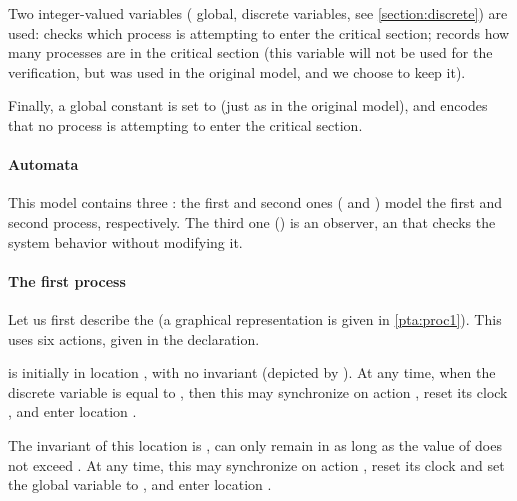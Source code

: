 Two integer-valued variables (\ie{} global, discrete variables, see \cref{section:discrete}) are used:
 checks which process is attempting to enter the critical section;
 records how many processes are in the critical section (this variable will not be used for the verification, but was used in the original \pat{} model, and we choose to keep it).

Finally, a global constant  is set to  (just as in the original \pat{} model), and encodes that no process is attempting to enter the critical section.





\paragraph{Automata}
This model contains three \IPTA{}:
the first and second ones ( and ) model the first and second process, respectively. The third one () is an observer, \ie{} an \IPTA{} that checks the system behavior without modifying it.

\paragraph{The first process}
Let us first describe the \IPTA{}  (a graphical representation is given in \cref{pta:proc1}).
This \IPTA{} uses six actions, given in the  declaration.

 is initially in location , with no invariant (depicted by ).
At any time, when the discrete variable  is equal to , then this \IPTA{} may synchronize on action , reset its clock , and enter location .

The invariant of this location is , \ie{}  can only remain in  as long as the value of  does not exceed .
At any time, this \IPTA{} may synchronize on action , reset its clock  and set the global variable  to , and enter location .

